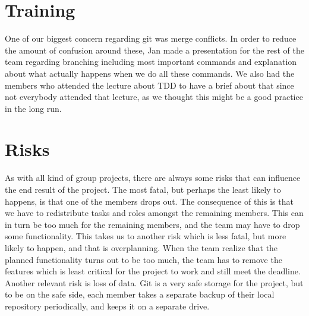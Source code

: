 \documentclass{article}
\begin{document}
\section*{Training}
One of our biggest concern regarding git was merge conflicts. In order to reduce the amount of confusion around these, Jan made a presentation for the rest of the team regarding branching including most important commands and explanation about what actually happens when we do all these commands.
We also had the members who attended the lecture about TDD to have a brief about that since not everybody attended that lecture, as we thought this might be a good practice in the long run.

\section*{Risks}
As with all kind of group projects, there are always some risks that can influence the end result of the project. The most fatal, but perhaps the least likely to happens, is that one of the members drops out. The consequence of this is that we have to redistribute tasks and roles amongst the remaining members. This can in turn be too much for the remaining members, and the team may have to drop some functionality. This takes us to another risk which is less fatal, but more likely to happen, and that is overplanning. When the team realize that the planned functionality turns out to be too much, the team has to remove the features which is least critical for the project to work and still meet the deadline.
Another relevant risk is loss of data. Git is a very safe storage for the project, but to be on the safe side, each member takes a separate backup of their local repository periodically, and keeps it on a separate drive.
\end{document}
